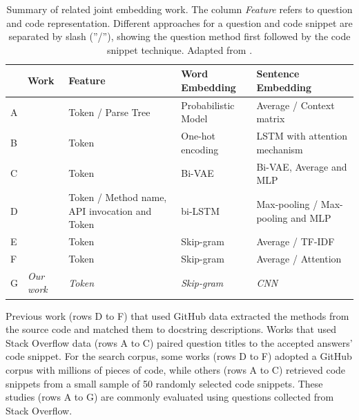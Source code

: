 \documentclass[sigconf]{acmart}
\begin{document}
\begin{table}[t]
\centering
\begin{tabular}{ p{0.1cm} p{2cm} p{1.5cm} p{1.5cm} p{1.5cm} }
 \hline
 & \textbf{Work} & \textbf{Feature} & \textbf{Word Embedding} & \textbf{Sentence Embedding} \\
 \hline
A & \citet{Allamanis-bimodal-source-code-natural-language:2015} & Token / Parse Tree & Probabilistic Model & Average / Context matrix  \\

B &\citet{iyer-etal-2016-summarizing} & Token & One-hot encoding & LSTM with attention mechanism  \\

C &\citet{Chen-bi-variational-autoencoder:2018} & Token & Bi-VAE & Bi-VAE, Average and MLP  \\

D &\citet{Gu-deep-code-search:2018} & Token / Method name, API invocation and Token & bi-LSTM & Max-pooling / Max-pooling and MLP   \\

E &\citet{Sachdev-neural-code-search:2018} & Token & Skip-gram & Average / TF-IDF   \\

F &\citet{cambronero-deep-code-search-2019} & Token & Skip-gram & Average / Attention   \\

G & \textit{Our work} & \textit{Token} & \textit{Skip-gram} & \textit{CNN}   \\

 \hline
\end{tabular}
\caption{Summary of related joint embedding work. The column \emph{Feature} refers to question and code representation. Different approaches for a question and code snippet are separated by slash (''/''), showing the question method first followed by the code snippet technique. Adapted from \cite{yan-benchmark-code-search-information-retrieval-deep-learning:2020}.}
\label{table:summary-joint-embedding-related-work}
\end{table}

Previous work (rows D to F) that used GitHub data extracted the methods from the source code and matched them to docstring descriptions. Works that used Stack Overflow data (rows A to C) paired question titles to the accepted answers' code snippet. For the search corpus, some works (rows D to F) adopted a GitHub corpus with millions of pieces of code, while others (rows A to C) retrieved code snippets from a small sample of 50 randomly selected code snippets. These studies (rows A to G) are commonly evaluated using questions collected from Stack Overflow. 
\end{document}
